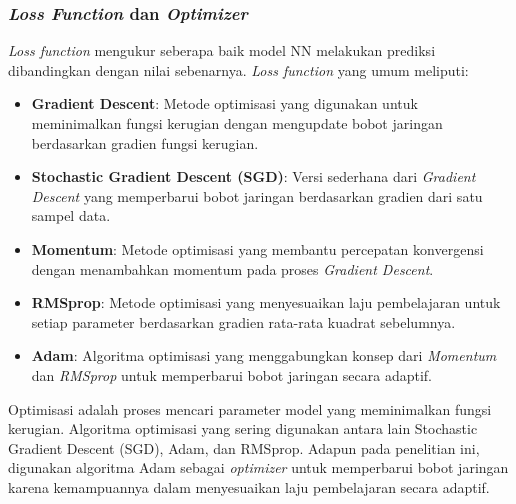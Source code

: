  \subsubsection{\emph{Loss Function} dan \emph{Optimizer}}
 \emph{Loss function} mengukur seberapa baik model NN melakukan prediksi dibandingkan dengan nilai sebenarnya. \emph{Loss function} yang umum meliputi:
 \begin{itemize}
   \item \textbf{Gradient Descent}: Metode optimisasi yang digunakan untuk meminimalkan fungsi kerugian dengan mengupdate bobot jaringan berdasarkan gradien fungsi kerugian.
   \item \textbf{Stochastic Gradient Descent (SGD)}: Versi sederhana dari \emph{Gradient Descent} yang memperbarui bobot jaringan berdasarkan gradien dari satu sampel data.
   \item \textbf{Momentum}: Metode optimisasi yang membantu percepatan konvergensi dengan menambahkan momentum pada proses \emph{Gradient Descent}.
   \item \textbf{RMSprop}: Metode optimisasi yang menyesuaikan laju pembelajaran untuk setiap parameter berdasarkan gradien rata-rata kuadrat sebelumnya.
   \item \textbf{Adam}: Algoritma optimisasi yang menggabungkan konsep dari \emph{Momentum} dan \emph{RMSprop} untuk memperbarui bobot jaringan secara adaptif.
 \end{itemize}
 
 Optimisasi adalah proses mencari parameter model yang meminimalkan fungsi kerugian. Algoritma optimisasi yang sering digunakan antara lain Stochastic Gradient Descent (SGD), Adam, dan RMSprop. Adapun pada penelitian ini, digunakan algoritma Adam sebagai \emph{optimizer} untuk memperbarui bobot jaringan karena kemampuannya dalam menyesuaikan laju pembelajaran secara adaptif.
 
